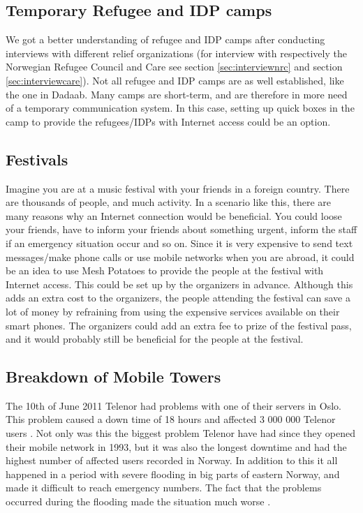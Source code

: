 \subsection{Temporary Refugee and IDP camps}
We got a better understanding of refugee and IDP camps after conducting interviews with different relief organizations (for interview with respectively the Norwegian Refugee Council and Care see section \ref{sec:interviewnrc} and section \ref{sec:interviewcare}). 
Not all refugee and IDP camps are as well established, like the one in Dadaab. Many camps are short-term, and are therefore in more need of a temporary communication system. In this case, setting up \gls{quick} boxes in the camp to provide the refugees/IDPs with Internet access could be an option. 

\subsection{Festivals}
Imagine you are at a music festival with your friends in a foreign country. There are thousands of people, and much activity. In a scenario like this, there are many reasons why an Internet connection would be beneficial. You could loose your friends, have to inform your friends about something urgent, inform the staff if an emergency situation occur and so on. Since it is very expensive to send text messages/make phone calls or use mobile networks when you are abroad, it could be an idea to use Mesh Potatoes to provide the people at the festival with Internet access. This could be set up by the organizers in advance. Although this adds an extra cost to the organizers, the people attending the festival can save a lot of money by refraining from using the expensive services available on their smart phones. The organizers could add an extra fee to prize of the festival pass, and it would probably still be beneficial for the people at the festival. 

\subsection{Breakdown of Mobile Towers}

The 10th of June 2011 Telenor had problems with one of their servers in Oslo. This problem caused a down time of 18 hours and affected 3 000 000 Telenor users \cite{listeNedetid}. Not only was this the biggest problem Telenor have had since they opened their mobile network in 1993, but it was also the longest downtime and had the highest number of affected users recorded in Norway. In addition to this it all happened in a period with severe flooding in big parts of eastern Norway, and made it difficult to reach emergency numbers. The fact that the problems occurred during the flooding made the situation much worse \cite{TelenorNede}.
